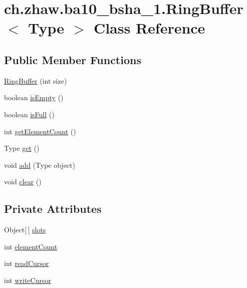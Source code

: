 \hypertarget{classch_1_1zhaw_1_1ba10__bsha__1_1_1RingBuffer_3_01Type_01_4}{
\section{ch.zhaw.ba10\_\-bsha\_\-1.RingBuffer$<$ Type $>$ Class Reference}
\label{classch_1_1zhaw_1_1ba10__bsha__1_1_1RingBuffer_3_01Type_01_4}
}
\subsection*{Public Member Functions}
\begin{DoxyCompactItemize}
\item 
\hyperlink{classch_1_1zhaw_1_1ba10__bsha__1_1_1RingBuffer_3_01Type_01_4_ae1dfe88c3ce02a51d0f7cd05ea7adb25}{RingBuffer} (int size)
\item 
boolean \hyperlink{classch_1_1zhaw_1_1ba10__bsha__1_1_1RingBuffer_3_01Type_01_4_aecfc46c5e25cecd04fdabd85d773a5d8}{isEmpty} ()
\item 
boolean \hyperlink{classch_1_1zhaw_1_1ba10__bsha__1_1_1RingBuffer_3_01Type_01_4_a15be0d2b15a323b9d3fab9bcf7ebe9a8}{isFull} ()
\item 
int \hyperlink{classch_1_1zhaw_1_1ba10__bsha__1_1_1RingBuffer_3_01Type_01_4_a0e958d4d07b0d8d782036b0593b80cb8}{getElementCount} ()
\item 
Type \hyperlink{classch_1_1zhaw_1_1ba10__bsha__1_1_1RingBuffer_3_01Type_01_4_a8e0a51acf2fd13ad7e935583bd7b386a}{get} ()
\item 
void \hyperlink{classch_1_1zhaw_1_1ba10__bsha__1_1_1RingBuffer_3_01Type_01_4_a21bbdf937d9882aa3bedaa12659f1473}{add} (Type object)
\item 
void \hyperlink{classch_1_1zhaw_1_1ba10__bsha__1_1_1RingBuffer_3_01Type_01_4_acab4ce43532969d02efd5f3b64412ead}{clear} ()
\end{DoxyCompactItemize}
\subsection*{Private Attributes}
\begin{DoxyCompactItemize}
\item 
Object\mbox{[}$\,$\mbox{]} \hyperlink{classch_1_1zhaw_1_1ba10__bsha__1_1_1RingBuffer_3_01Type_01_4_a0f05e508eb82500d1f00fb0a13fee154}{slots}
\item 
int \hyperlink{classch_1_1zhaw_1_1ba10__bsha__1_1_1RingBuffer_3_01Type_01_4_a83cb75811921f53d1ea9cd289d6132a6}{elementCount}
\item 
int \hyperlink{classch_1_1zhaw_1_1ba10__bsha__1_1_1RingBuffer_3_01Type_01_4_a92cc08d7afa1de0617a23432c047eb36}{readCursor}
\item 
int \hyperlink{classch_1_1zhaw_1_1ba10__bsha__1_1_1RingBuffer_3_01Type_01_4_aecc4ed40393c864568b0806a6349de11}{writeCursor}
\end{DoxyCompactItemize}



